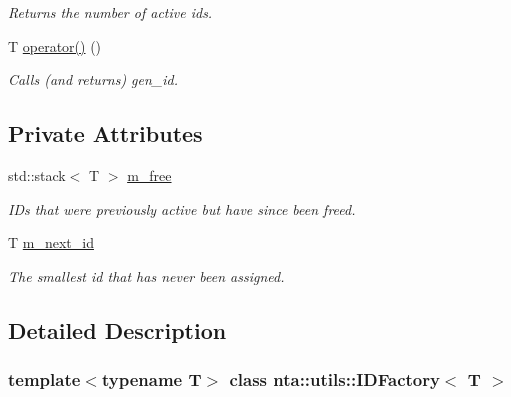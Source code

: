 \begin{DoxyCompactItemize}
\begin{DoxyCompactList}\small\item\em Returns the number of active ids. \end{DoxyCompactList}\item 
\mbox{\label{classnta_1_1utils_1_1IDFactory_a88f65b6f846fa72cbab690f69b912944}} 
T \hyperlink{classnta_1_1utils_1_1IDFactory_a88f65b6f846fa72cbab690f69b912944}{operator()} ()
\begin{DoxyCompactList}\small\item\em Calls (and returns) gen\+\_\+id. \end{DoxyCompactList}\end{DoxyCompactItemize}
\subsection*{Private Attributes}
\begin{DoxyCompactItemize}
\item 
\mbox{\label{classnta_1_1utils_1_1IDFactory_a1bb36b967e6431640bad6d843aa15db7}} 
std\+::stack$<$ T $>$ \hyperlink{classnta_1_1utils_1_1IDFactory_a1bb36b967e6431640bad6d843aa15db7}{m\+\_\+free}
\begin{DoxyCompactList}\small\item\em I\+Ds that were previously active but have since been freed. \end{DoxyCompactList}\item 
\mbox{\label{classnta_1_1utils_1_1IDFactory_a0c85b0126b9b5312083d6619ff6d0c2a}} 
T \hyperlink{classnta_1_1utils_1_1IDFactory_a0c85b0126b9b5312083d6619ff6d0c2a}{m\+\_\+next\+\_\+id}
\begin{DoxyCompactList}\small\item\em The smallest id that has never been assigned. \end{DoxyCompactList}\end{DoxyCompactItemize}


\subsection{Detailed Description}
\subsubsection*{template$<$typename T$>$\newline
class nta\+::utils\+::\+I\+D\+Factory$<$ T $>$}

